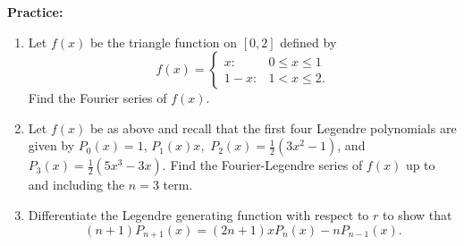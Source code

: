 \documentclass{article}
\begin{document}
\clearpage



\textbf{Practice:}\bigskip


\begin{enumerate}
	\item Let $f(x)$ be the triangle function on $[0,2]$ defined by
		\[f(x)=\begin{cases}
			x: & 0\leq x\leq 1\\
			1-x: & 1<x\leq 2.
			\end{cases}\]
		Find the Fourier series of $f(x)$.
	\item Let $f(x)$ be as above and recall that the first four Legendre polynomials are given by $P_0(x)=1$, $P_1(x)x,$ $P_2(x)=\frac{1}{2}\left(3x^2-1\right)$, and $P_3(x)=\frac{1}{2}\left(5x^3-3x\right)$. Find the Fourier-Legendre series of $f(x)$ up to and including the $n=3$ term.
	\item Differentiate the Legendre generating function with respect to $r$ to show that
		\[(n+1)P_{n+1}(x)=(2n+1)xP_n(x)-nP_{n-1}(x).\]
\end{enumerate}
\end{document}

